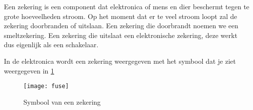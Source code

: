 Een zekering is een component dat elektronica of mens en dier beschermt tegen te grote hoeveelheden stroom. Op het moment dat er te veel stroom loopt zal de zekering doorbranden of uitslaan. Een zekering die doorbrandt noemen we een smeltzekering. Een zekering die uitslaat een elektronische zekering, deze werkt dus eigenlijk als een schakelaar.

In de elektronica wordt een zekering weergegeven met het symbool dat je ziet weergegeven in \ref{symbool:fuse}

\begin{figure}[h]
\texttt{[image: fuse]}
\centering
\caption{Symbool van een zekering}
\label{symbool:fuse}
\end{figure}
